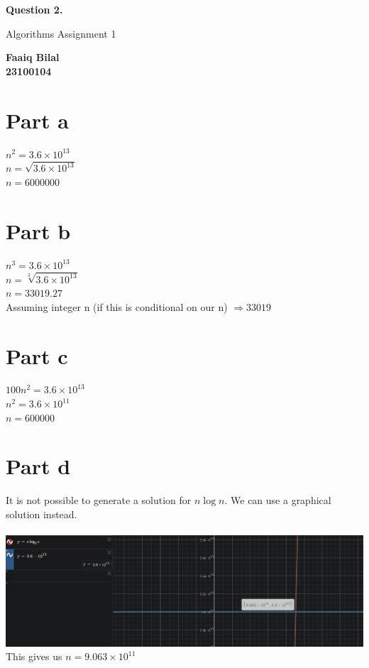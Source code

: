 \documentclass[]{article}
\begin{document}
\begin{center}
    \vspace*{1cm}

    \textbf{Question 2.}

    \vspace{0.5cm}
     Algorithms Assignment 1

    \vspace{0.15cm}

    \textbf{Faaiq Bilal} \\ 
    \textbf{23100104}
         
\end{center}

\section{Part a}

$ n^2 = 3.6 \times 10^{13} $ \\
$ n = \sqrt{3.6 \times 10^{13}}   $ \\
$ n = 6000000 $ 

\section{Part b}
$ n^3 = 3.6 \times 10^{13}$ \\
$ n = \sqrt[3]{3.6 \times 10^{13}} $ \\
$ n = 33019.27 $ \\
Assuming integer n (if this is conditional on our n) $ \Longrightarrow 33019 $ 

\section{Part c}
$ 100 n^2 = 3.6 \times 10^{13}$ \\
$ n^2 = 3.6 \times 10^{11}$ \\
$ n = 600000 $ 

\section{Part d}
It is not possible to generate a solution for $ n \log{n}$. We can use a graphical solution instead. \\ \\ 
\includegraphics[scale=0.5]{Screenshot_14.png}
\\ This gives us $ n = 9.063 \times 10^{11} $ \\
\end{document}
